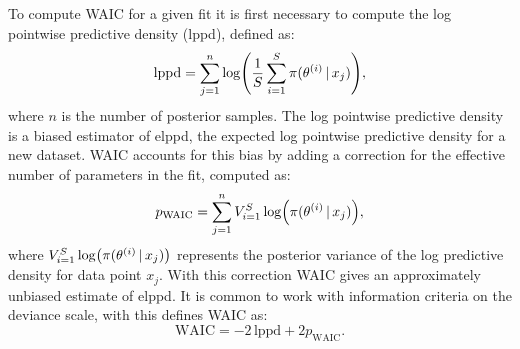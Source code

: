 To compute WAIC for a given fit it is first necessary to compute the log
pointwise predictive density (lppd), defined as:
\begin{equation*}
  \text{lppd} = \sum_{j=1}^n \log(\frac{1}{S} \sum_{i=1}^S \pi(\theta^{(i)} \,|\, x_j)),
\end{equation*}
where $n$ is the number of posterior samples. The log pointwise predictive
density is a biased estimator of elppd, the expected log pointwise predictive
density for a new dataset.  WAIC accounts for this bias by adding a correction
for the effective number of parameters in the fit, computed as:
\begin{equation*}
    p_{\text{WAIC}} = \sum_{j=1}^n V_{i=1}^{S}\log(\pi(\theta^{(i)} \,|\, x_j)),
\end{equation*}
where $V_{i=1}^{S}\log(\pi(\theta^{(i)} \,|\, x_j))$ represents the posterior
variance of the log predictive density for data point $x_j$. With this
correction WAIC gives an approximately unbiased estimate of elppd. It is common
to work with information criteria on the deviance scale, with this
\textcite{watanabe09} defines WAIC as:
\begin{equation*}
    \text{WAIC} = -2\,\text{lppd} +2p_{\text{WAIC}}.
\end{equation*}

